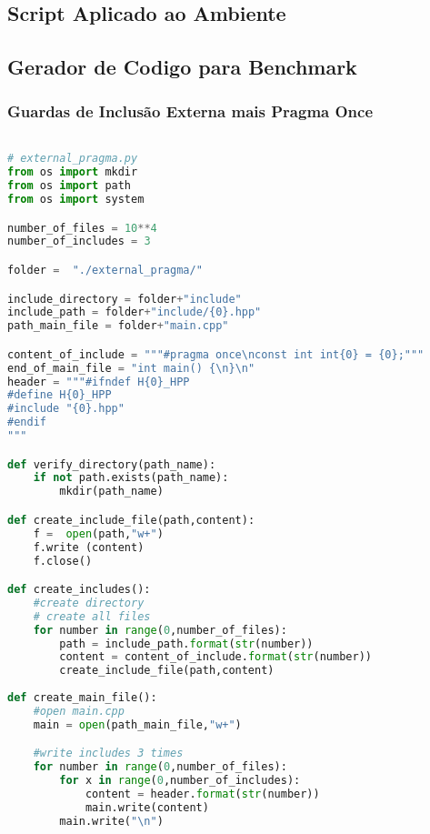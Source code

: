 \begin{apendicesenv}

\partapendices

\chapter{Script Aplicado ao Ambiente}

\section{Gerador de Codigo para Benchmark}

\subsection{Guardas de Inclusão Externa mais Pragma Once}
\begin{lstlisting}[language=Python, caption={
     Script Guardas de Inclusão Externa mais pragma once},
                  label=script_external_pragma_include]

# external_pragma.py
from os import mkdir
from os import path
from os import system

number_of_files = 10**4
number_of_includes = 3

folder =  "./external_pragma/"

include_directory = folder+"include"
include_path = folder+"include/{0}.hpp"
path_main_file = folder+"main.cpp"

content_of_include = """#pragma once\nconst int int{0} = {0};"""
end_of_main_file = "int main() {\n}\n"
header = """#ifndef H{0}_HPP
#define H{0}_HPP
#include "{0}.hpp"
#endif
"""

def verify_directory(path_name):
    if not path.exists(path_name):
        mkdir(path_name)

def create_include_file(path,content):
    f =  open(path,"w+")
    f.write (content)
    f.close()

def create_includes():
    #create directory
    # create all files
    for number in range(0,number_of_files):
        path = include_path.format(str(number))
        content = content_of_include.format(str(number))
        create_include_file(path,content)
    
def create_main_file():
    #open main.cpp
    main = open(path_main_file,"w+")

    #write includes 3 times
    for number in range(0,number_of_files):
        for x in range(0,number_of_includes):
            content = header.format(str(number))
            main.write(content)
        main.write("\n")


\end{lstlisting}
\end{apendicesenv}
